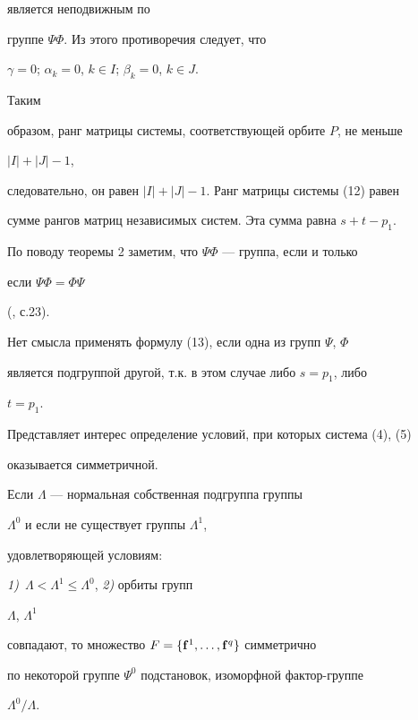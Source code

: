 \begin{pf}
является неподвижным по


группе $\Psi\Phi$. Из этого противоречия следует, что


$\gamma=0$; $\alpha_k=0$, $k\in I$; $\beta_k=0$, $k\in J$.


Таким


образом, ранг матрицы системы, соответствующей орбите $P$, не меньше


$|I|+|J|-1$,


следовательно, он равен $|I|+|J|-1$. Ранг матрицы системы (12) равен


сумме рангов матриц независимых систем. Эта сумма равна $s+t-p_1$.


\end{pf}





По поводу теоремы 2 заметим, что $\Psi\Phi$ --- группа, если и только


если $\Psi\Phi=\Phi\Psi$


(\cite{Kar}, с.23).





Нет смысла применять формулу (13), если одна из групп $\Psi$, $\Phi$


является подгруппой другой, т.к. в этом случае либо $s=p_1$, либо


$t=p_1$.





Представляет интерес определение условий, при которых система (4), (5)


оказывается симметричной.





\begin{thm}


Если $\Lambda$ --- нормальная собственная подгруппа группы


$\Lambda^0$ и если не существует группы $\Lambda^1$,


удовлетворяющей условиям:


{\em 1)}~$\Lambda<\Lambda^1\le\Lambda^0$, {\em 2)} орбиты групп


$\Lambda$, $\Lambda^1$


совпадают, то множество $F=\{\bold f^1,\dotsc,\bold f^q\}$ симметрично


по некоторой группе $\Psi^0$ подстановок, изоморфной фактор-группе


$\Lambda^0/\Lambda$.


\end{thm}





